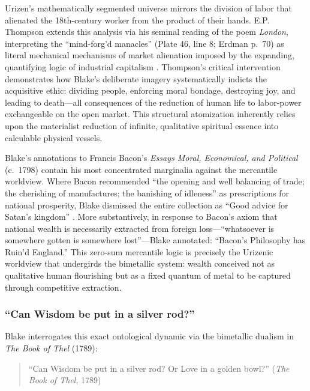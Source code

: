 \documentclass[
]{article}
\begin{document}
Urizen's mathematically segmented universe mirrors the division of labor
that alienated the 18th-century worker from the product of their hands.
E.P. Thompson extends this analysis via his seminal reading of the poem
\emph{London}, interpreting the ``mind-forg'd manacles'' (Plate 46, line
8; Erdman p.~70) as literal mechanical mechanisms of market alienation
imposed by the expanding, quantifying logic of industrial capitalism
\citep{thompson1993witness}. Thompson's critical intervention
demonstrates how Blake's deliberate imagery systematically indicts the
acquisitive ethic: dividing people, enforcing moral bondage, destroying
joy, and leading to death---all consequences of the reduction of human
life to labor-power exchangeable on the open market. This structural
atomization inherently relies upon the materialist reduction of
infinite, qualitative spiritual essence into calculable physical
vessels.

Blake's annotations to Francis Bacon's \emph{Essays Moral, Economical,
and Political} (c.~1798) contain his most concentrated marginalia
against the mercantile worldview. Where Bacon recommended ``the opening
and well balancing of trade; the cherishing of manufactures; the
banishing of idleness'' as prescriptions for national prosperity, Blake
dismissed the entire collection as ``Good advice for Satan's kingdom''
\citep{erdman1988complete}. More substantively, in response to Bacon's
axiom that national wealth is necessarily extracted from foreign
loss---``whatsoever is somewhere gotten is somewhere lost''---Blake
annotated: ``Bacon's Philosophy has Ruin'd England.'' This zero-sum
mercantile logic is precisely the Urizenic worldview that undergirds the
bimetallic system: wealth conceived not as qualitative human flourishing
but as a fixed quantum of metal to be captured through competitive
extraction.

\subsubsection{``Can Wisdom be put in a silver
rod?''}\label{can-wisdom-be-put-in-a-silver-rod}

Blake interrogates this exact ontological dynamic via the bimetallic
dualism in \emph{The Book of Thel} (1789):

\begin{quote}
``Can Wisdom be put in a silver rod? Or Love in a golden bowl?''
(\emph{The Book of Thel}, 1789) \citep{blake1789thel}
\end{quote}
\end{document}
